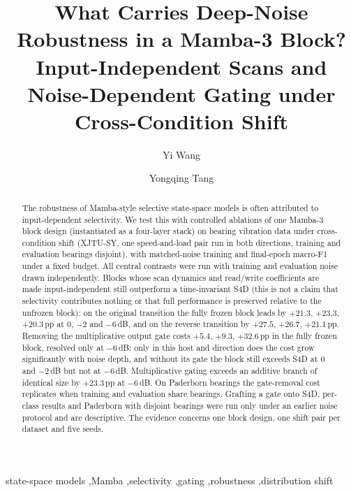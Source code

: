 \documentclass[preprint,12pt]{elsarticle}
\begin{document}
\begin{frontmatter}

\title{What Carries Deep-Noise Robustness in a Mamba-3 Block? Input-Independent Scans and Noise-Dependent Gating under Cross-Condition Shift}

\author[lsu]{Yi Wang}
\author[lyu]{Yongqing Tang}
\address[lsu]{College of Engineering, Lishui University, Lishui, Zhejiang 323000, People's Republic of China}
\address[lyu]{School of Physics, Mechanics and Electronics, Longyan University, Longyan, Fujian, People's Republic of China}

\begin{abstract}
The robustness of Mamba-style selective state-space models is often attributed to input-dependent selectivity. We test this with controlled ablations of one Mamba-3 block design (instantiated as a four-layer stack) on bearing vibration data under cross-condition shift (XJTU-SY, one speed-and-load pair run in both directions, training and evaluation bearings disjoint), with matched-noise training and final-epoch macro-F1 under a fixed budget. All central contrasts were run with training and evaluation noise drawn independently. Blocks whose scan dynamics and read/write coefficients are made input-independent still outperform a time-invariant S4D (this is not a claim that selectivity contributes nothing or that full performance is preserved relative to the unfrozen block): on the original transition the fully frozen block leads by $+21.3$, $+23.3$, $+20.3$\,pp at $0$, $-2$ and $-6$\,dB, and on the reverse transition by $+27.5$, $+26.7$, $+21.1$\,pp. Removing the multiplicative output gate costs $+5.4$, $+9.3$, $+32.6$\,pp in the fully frozen block, resolved only at $-6$\,dB; only in this host and direction does the cost grow significantly with noise depth, and without its gate the block still exceeds S4D at $0$ and $-2$\,dB but not at $-6$\,dB. Multiplicative gating exceeds an additive branch of identical size by $+23.3$\,pp at $-6$\,dB. On Paderborn bearings the gate-removal cost replicates when training and evaluation share bearings. Grafting a gate onto S4D, per-class results and Paderborn with disjoint bearings were run only under an earlier noise protocol and are descriptive. The evidence concerns one block design, one shift pair per dataset and five seeds.
\end{abstract}

\begin{keyword}
state-space models \sep Mamba \sep selectivity \sep gating \sep robustness \sep distribution shift
\end{keyword}

\end{frontmatter}
\end{document}
